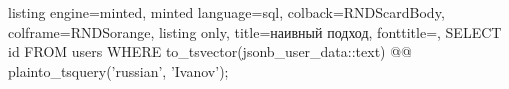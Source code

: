 \begin{frame}[fragile, t]
    \begin{tcblisting}{
      listing engine=minted,
      minted language=sql,
      colback=RNDScardBody,
      colframe=RNDSorange,
      listing only,
      title=наивный подход,
      fonttitle=\normalsize,
    }
SELECT 
  id 
FROM 
  users 
WHERE 
  to_tsvector(jsonb_user_data::text) @@ 
  plainto_tsquery('russian', 'Ivanov');
  \end{tcblisting}
\end{frame}
